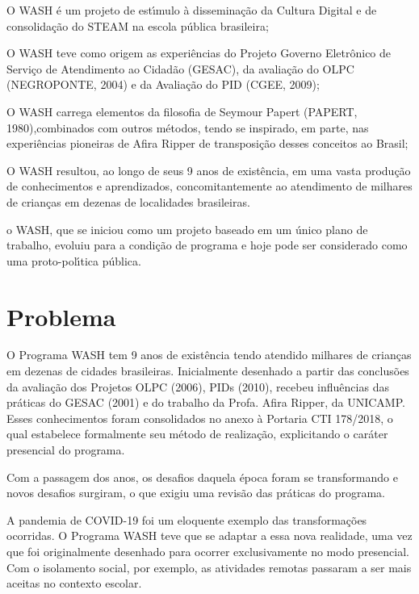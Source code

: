 \documentclass[
12pt,		%
openright,	%
twoside,  %
a4paper,			%
chapter=TITLE,		%
english,			%
french,				%
spanish,			%
brazil				%
]{USPSC-classe/USPSC}
\begin{document}
\begin{alineas}
\item O WASH \'e um projeto de est\'{\i}mulo \`a dissemina\c{c}\~ao da Cultura Digital e de consolida\c{c}\~ao do STEAM na escola p\'ublica brasileira;
\item O WASH teve como origem as experi\^encias do Projeto Governo Eletr\^onico de Servi\c{c}o de Atendimento ao Cidad\~ao (GESAC), da avalia\c{c}\~ao do OLPC (NEGROPONTE, 2004) e da Avalia\c{c}\~ao do PID (CGEE, 2009);
\item O WASH carrega elementos da filosofia de Seymour Papert (PAPERT, 1980),combinados com outros m\'etodos, tendo se inspirado, em parte, nas experi\^encias pioneiras de Afira Ripper de transposi\c{c}\~ao desses conceitos ao Brasil;
\item O WASH resultou, ao longo de seus 9 anos de exist\^encia, em uma vasta produ\c{c}\~ao de conhecimentos e aprendizados, concomitantemente ao atendimento de milhares de crian\c{c}as em dezenas de localidades brasileiras.
\item o WASH, que se iniciou como um projeto baseado em um \'unico plano de trabalho, evoluiu para a condi\c{c}\~ao de programa e hoje pode ser considerado como uma proto-pol\'{\i}tica p\'ublica.
\end{alineas}

\section[Problema]{Problema}\label{Problema}
O Programa WASH tem 9 anos de exist\^encia tendo atendido milhares de crian\c{c}as em dezenas de cidades brasileiras. Inicialmente desenhado a partir das conclus\~oes da avalia\c{c}\~ao dos Projetos OLPC (2006), PIDs (2010), recebeu influ\^encias das pr\'aticas do GESAC (2001) e do trabalho da Profa. Afira Ripper, da UNICAMP. Esses conhecimentos foram consolidados no anexo \`a Portaria CTI 178/2018, o qual estabelece formalmente seu m\'etodo de realiza\c{c}\~ao, explicitando o car\'ater presencial do programa.




Com a passagem dos anos, os desafios daquela \'epoca foram se transformando e novos desafios surgiram, o que exigiu uma revis\~ao das pr\'aticas do programa.




A pandemia de COVID-19 foi um eloquente exemplo das transforma\c{c}\~oes ocorridas. O Programa WASH teve que se adaptar a essa nova realidade, uma vez que foi originalmente desenhado para ocorrer exclusivamente no modo presencial. Com o isolamento social, por exemplo, as atividades remotas passaram a ser mais aceitas no contexto escolar.
\end{document}
